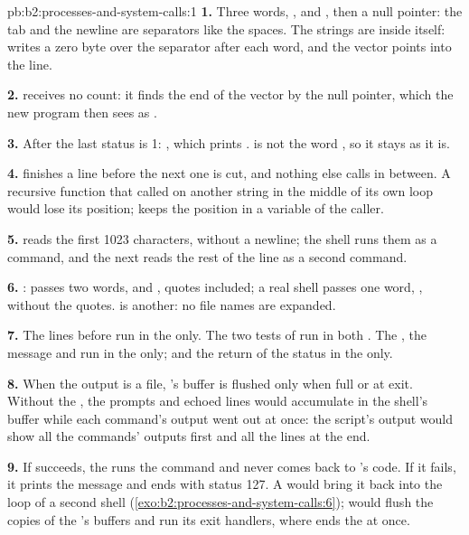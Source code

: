 \begin{solution}{pb:b2:processes-and-system-calls:1}
\textbf{1.} Three words, ,  and , then a null pointer: the tab and the newline are
separators like the spaces. The strings are inside  itself:  writes a zero byte over the
separator after each word, and the vector points into the line.

\textbf{2.}  receives no count: it finds the end of the vector by the null pointer, which the new
program then sees as .

\textbf{3.} After  the last status is 1: , which prints .  is not
the word , so it stays as it is.

\textbf{4.}  finishes a line before the next one is cut, and nothing else calls  in between.
A recursive function that called  on another string in the middle of its own loop would lose its
position;  keeps the position in a variable of the caller.

\textbf{5.}  reads the first 1023 characters, without a newline; the shell runs them as a command, and the
next  reads the rest of the line as a second command.

\textbf{6.} :  passes two words,  and , quotes included;
a real shell passes one word, , without the quotes.  is another: no file names are
expanded.

\textbf{7.} The lines before  run in the  only. The two tests of  run in both . The
, the message and  run in the  only;  and the return of the status in the
 only.

\textbf{8.} When the output is a file, 's buffer is flushed only when full or at exit. Without the
, the prompts and echoed lines would accumulate in the shell's buffer while each command's output went
out at once: the script's output would show all the commands' outputs first and all the  lines at the
end.

\textbf{9.} If  succeeds, the  runs the command and never comes back to 's code. If it
fails, it prints the message and ends with status 127. A  would bring it back into the loop of a second
shell (\cref{exo:b2:processes-and-system-calls:6});  would flush the copies of the 's buffers and run
its exit handlers, where  ends the  at once.


\end{solution}
